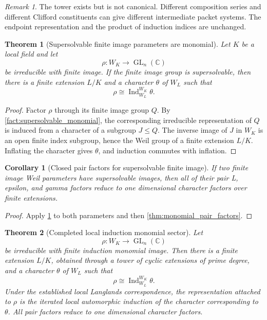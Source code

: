 \documentclass{aomart}
\newtheorem{theorem}{Theorem}[section]
\newtheorem{corollary}[corollary]{Corollary}
\theoremstyle{definition}
\theoremstyle{remark}
\newtheorem{remark}[remark]{Remark}
\newcommand{\CC}{\mathbb C}
\newcommand{\GL}{\operatorname{GL}}
\newcommand{\Ind}{\operatorname{Ind}}
\begin{document}
\begin{remark}\label{rem:tower_choice}
The tower exists but is not canonical. Different composition series and different Clifford constituents can give different intermediate packet systems. The endpoint representation and the product of induction indices are unchanged.
\end{remark}

\begin{theorem}[Supersolvable finite image parameters are monomial]\label{thm:supersolvable_parameter}
Let \(K\) be a local field and let
\[
\rho:W_K\longrightarrow\GL_n(\CC)
\]
be irreducible with finite image. If the finite image group is supersolvable, then there is a finite extension \(L/K\) and a character \(\theta\) of \(W_L\) such that
\[
\boxed{
\rho
\cong
\Ind_{W_L}^{W_K}\theta.
}
\]
\end{theorem}

\begin{proof}
Factor \(\rho\) through its finite image group \(Q\). By \cref{fact:supersolvable_monomial}, the corresponding irreducible representation of \(Q\) is induced from a character of a subgroup \(J\leq Q\). The inverse image of \(J\) in \(W_K\) is an open finite index subgroup, hence the Weil group of a finite extension \(L/K\). Inflating the character gives \(\theta\), and induction commutes with inflation.
\end{proof}

\begin{corollary}[Closed pair factors for supersolvable finite image]\label{cor:supersolvable_factors}
If two finite image Weil parameters have supersolvable images, then all of their pair L, epsilon, and gamma factors reduce to one dimensional character factors over finite extensions.
\end{corollary}

\begin{proof}
Apply \cref{thm:supersolvable_parameter} to both parameters and then \cref{thm:monomial_pair_factors}.
\end{proof}

\begin{theorem}[Completed local induction monomial sector]\label{thm:local_nilpotent_completion}
Let
\[
\rho:W_K\longrightarrow\GL_n(\CC)
\]
be irreducible with finite induction monomial image. Then there is a finite extension \(L/K\), obtained through a tower of cyclic extensions of prime degree, and a character \(\theta\) of \(W_L\) such that
\[
\boxed{
\rho\cong\Ind_{W_L}^{W_K}\theta.
}
\]
Under the established local Langlands correspondence, the representation attached to \(\rho\) is the iterated local automorphic induction of the character corresponding to \(\theta\). All pair factors reduce to one dimensional character factors.
\end{theorem}
\end{document}
